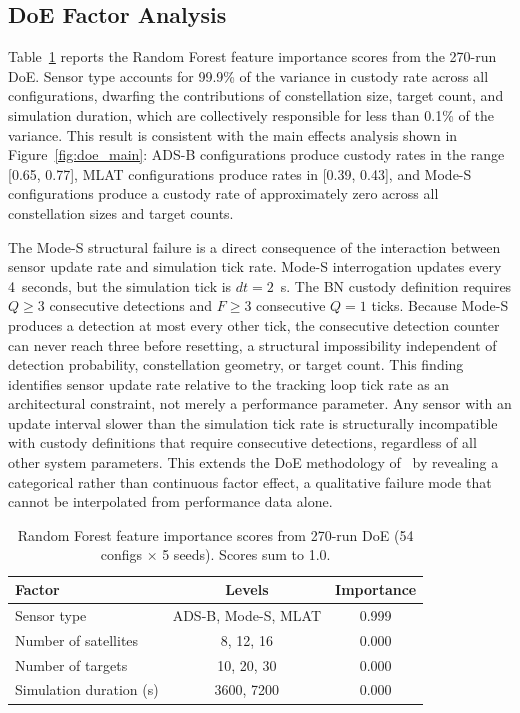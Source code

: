 \documentclass[]{spie}
\begin{document}
\subsection{DoE Factor Analysis}
\label{sec:doe_analysis}

Table~\ref{tab:doe} reports the Random Forest feature importance scores from the 270-run DoE. Sensor type accounts for 99.9\% of the variance in custody rate across all configurations, dwarfing the contributions of constellation size, target count, and simulation duration, which are collectively responsible for less than 0.1\% of the variance. This result is consistent with the main effects analysis shown in Figure~\ref{fig:doe_main}: ADS-B configurations produce custody rates in the range [0.65, 0.77], MLAT configurations produce rates in [0.39, 0.43], and Mode-S configurations produce a custody rate of approximately zero across all constellation sizes and target counts.

The Mode-S structural failure is a direct consequence of the interaction between sensor update rate and simulation tick rate. Mode-S interrogation updates every 4~seconds, but the simulation tick is $dt = 2$~s. The BN custody definition requires $Q \geq 3$ consecutive detections and $F \geq 3$ consecutive $Q{=}1$ ticks. Because Mode-S produces a detection at most every other tick, the consecutive detection counter can never reach three before resetting, a structural impossibility independent of detection probability, constellation geometry, or target count. This finding identifies sensor update rate relative to the tracking loop tick rate as an architectural constraint, not merely a performance parameter. Any sensor with an update interval slower than the simulation tick rate is structurally incompatible with custody definitions that require consecutive detections, regardless of all other system parameters. This extends the DoE methodology of~\cite{Saeed2025DOEFramework} by revealing a categorical rather than continuous factor effect, a qualitative failure mode that cannot be interpolated from performance data alone.

\begin{table}[h]
    \caption{Random Forest feature importance scores from 270-run DoE (54 configs $\times$ 5 seeds). Scores sum to 1.0.}
    \label{tab:doe}
    \centering
    \begin{tabular}{lcc}
    \toprule
        Factor & Levels & Importance \\
    \midrule
    Sensor type & ADS-B, Mode-S, MLAT & 0.999 \\
    Number of satellites & 8, 12, 16 & 0.000 \\
    Number of targets & 10, 20, 30 & 0.000 \\
    Simulation duration (s) & 3600, 7200 & 0.000 \\
    \bottomrule
    \end{tabular}
\end{table}
\end{document}
